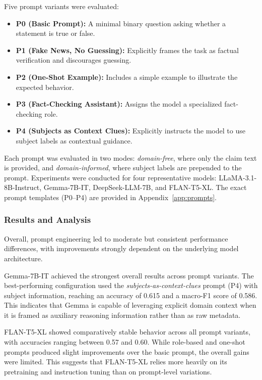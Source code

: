 Five prompt variants were evaluated:

\begin{itemize}
    \item \textbf{P0 (Basic Prompt):} A minimal binary question asking whether a statement is true or false.
    \item \textbf{P1 (Fake News, No Guessing):} Explicitly frames the task as factual verification and discourages guessing.
    \item \textbf{P2 (One-Shot Example):} Includes a simple example to illustrate the expected behavior.
    \item \textbf{P3 (Fact-Checking Assistant):} Assigns the model a specialized fact-checking role.
    \item \textbf{P4 (Subjects as Context Clues):} Explicitly instructs the model to use subject labels as contextual guidance.
\end{itemize}

Each prompt was evaluated in two modes: \emph{domain-free}, where only the claim text is provided, and \emph{domain-informed}, where subject labels are prepended to the prompt. Experiments were conducted for four representative models: LLaMA-3.1-8B-Instruct, Gemma-7B-IT, DeepSeek-LLM-7B, and FLAN-T5-XL. The exact prompt templates (P0--P4) are provided in Appendix~\ref{app:prompts}.


\subsubsection{Results and Analysis}

Overall, prompt engineering led to moderate but consistent performance differences, with improvements strongly dependent on the underlying model architecture.

Gemma-7B-IT achieved the strongest overall results across prompt variants. The best-performing configuration used the \emph{subjects-as-context-clues} prompt (P4) with subject information, reaching an accuracy of 0.615 and a macro-F1 score of 0.586. This indicates that Gemma is capable of leveraging explicit domain context when it is framed as auxiliary reasoning information rather than as raw metadata.

FLAN-T5-XL showed comparatively stable behavior across all prompt variants, with accuracies ranging between 0.57 and 0.60. While role-based and one-shot prompts produced slight improvements over the basic prompt, the overall gains were limited. This suggests that FLAN-T5-XL relies more heavily on its pretraining and instruction tuning than on prompt-level variations.

